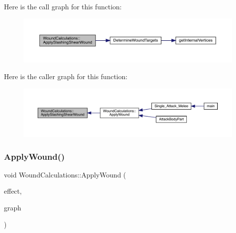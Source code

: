Here is the call graph for this function\+:
\nopagebreak
\begin{figure}[H]
\begin{center}
\leavevmode
\includegraphics[width=350pt]{db/d1e/class_wound_calculations_ae0e649e97591c6a6b28d6a4ff7e0324e_cgraph}
\end{center}
\end{figure}
Here is the caller graph for this function\+:
\nopagebreak
\begin{figure}[H]
\begin{center}
\leavevmode
\includegraphics[width=350pt]{db/d1e/class_wound_calculations_ae0e649e97591c6a6b28d6a4ff7e0324e_icgraph}
\end{center}
\end{figure}
\mbox{\label{class_wound_calculations_a8143ba01702cf1a1072d17ee7deab4e0}} 
\subsubsection{\texorpdfstring{Apply\+Wound()}{ApplyWound()}}
{\footnotesize\ttfamily void Wound\+Calculations\+::\+Apply\+Wound (\begin{DoxyParamCaption}\item[{\mbox{\hyperlink{struct_applied_force_effect}{Applied\+Force\+Effect}} \&}]{effect,  }\item[{\mbox{\hyperlink{_body_graph_8hpp_ab01b157c2e143191570b012d275fbf0d}{Anatomy\+Graph}} \&}]{graph }\end{DoxyParamCaption})}

